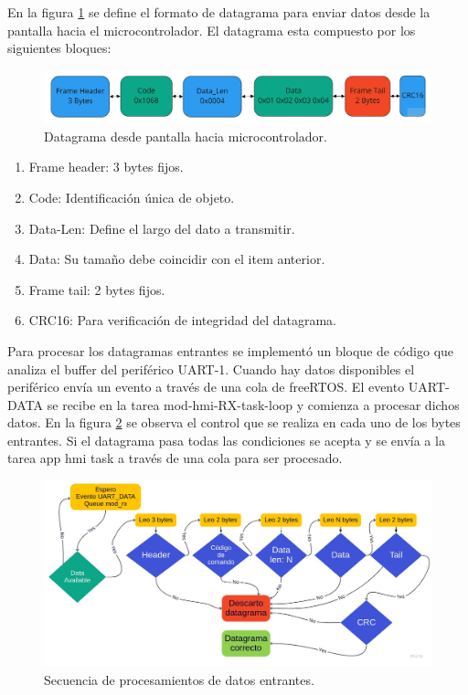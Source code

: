 En la figura \ref{fig:datagrama_a} se define el formato de datagrama para enviar datos desde la pantalla hacia el microcontrolador. El datagrama esta compuesto por los siguientes bloques:

\begin{figure}[h!]
	\centering
	\includegraphics[width=1\textwidth]{./Figures/datagrama_a.jpg}
	\caption{Datagrama desde pantalla hacia microcontrolador.}
	\label{fig:datagrama_a}
\end{figure}

\begin{enumerate}

\item Frame header: 3 bytes fijos.
\item Code: Identificación única de objeto.
\item Data-Len: Define el largo del dato a transmitir.
\item Data: Su tamaño debe coincidir con el item anterior.
\item Frame tail: 2 bytes fijos.
\item CRC16: Para verificación de integridad del datagrama.

\end{enumerate}

Para procesar los datagramas entrantes se implementó un bloque de código que analiza el buffer del periférico UART-1. Cuando hay datos disponibles el periférico envía un evento a través de una cola de freeRTOS. El evento UART-DATA se recibe en la tarea mod-hmi-RX-task-loop y comienza a procesar dichos datos. En la figura \ref{fig:secuencia_a} se observa el control que se realiza en cada uno de los bytes entrantes. Si el datagrama pasa todas las condiciones se acepta y se envía a la tarea app hmi task a través de una cola para ser procesado.

\begin{figure}[h!]
	\centering
	\includegraphics[width=1\textwidth]{./Figures/Secuencia_lectura_uart_a.jpg}
	\caption{Secuencia de procesamientos de datos entrantes.}
	\label{fig:secuencia_a}
\end{figure}

